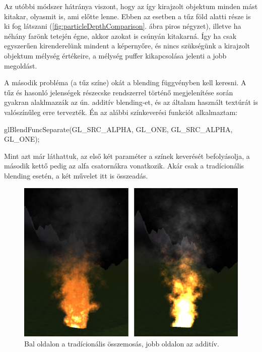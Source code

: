 Az utóbbi módszer hátránya viszont, hogy az így kirajzolt objektum minden mást kitakar, olyasmit is, ami előtte lenne. Ebben az esetben a tűz föld alatti része is ki fog látszani (\ref{fig:particleDepthComparison}. ábra piros négyzet), illetve ha néhány farönk tetején égne, akkor azokat is csúnyán kitakarná. Így ha csak egyszerűen kirenderelünk mindent a képernyőre, és nincs szükségünk a kirajzolt objektum mélység értékeire, a mélység puffer kikapcsolása jelenti a jobb megoldást.


A második probléma (a tűz színe) okát a blending függvényben kell keresni. A tűz és hasonló jelenségek részecske rendszerrel történő megjelenítése során gyakran alaklmazzák az ún. additív blending-et, és az általam használt textúrát is valószínűleg erre tervezték. Én az alábbi színkeverési funkciót alkalmaztam: 
\begin{cpp}
glBlendFuncSeparate(GL_SRC_ALPHA, GL_ONE, GL_SRC_ALPHA, GL_ONE);
\end{cpp}
Mint azt már láthattuk, az első két paraméter a színek keverését befolyásolja, a második kettő pedig az alfa csatornákra vonatkozik. Akár csak a tradícionális blending esetén, a két művelet itt is összeadás. 
\begin{figure}[h]
 \centering
 \includegraphics[width=\textwidth]{kepek/particleBlendingComparison.png}
 \caption{Bal oldalon a tradícionális összemosás, jobb oldalon az additív.}
 \label{fig:particleBlendingComparison}
\end{figure}

